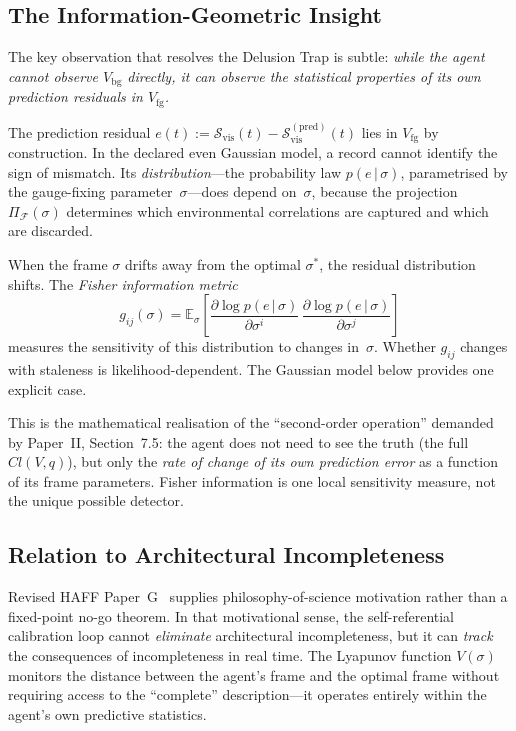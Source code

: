 \documentclass[12pt,a4paper,openany]{book}
\begin{document}
\subsection{The Information-Geometric Insight}
\label{T-III-subsec:insight}

The key observation that resolves the Delusion Trap is
subtle:
\emph{while the agent cannot observe $V_{\mathrm{bg}}$
directly, it can observe the statistical properties of its
own prediction residuals in $V_{\mathrm{fg}}$.}

The prediction residual
$e(t) := \mathcal{S}_{\mathrm{vis}}(t)
- \mathcal{S}_{\mathrm{vis}}^{(\mathrm{pred})}(t)$
lies in $V_{\mathrm{fg}}$ by construction.
In the declared even Gaussian model, a record cannot identify the sign
of mismatch.  Its \emph{distribution}---the probability law
$p(e\,|\,\sigma)$, parametrised by the gauge-fixing
parameter~$\sigma$---does depend on~$\sigma$, because the
projection $\Pi_{\mathcal{F}}(\sigma)$ determines which
environmental correlations are captured and which are
discarded.

When the frame $\sigma$ drifts away from the optimal
$\sigma^*$, the residual distribution shifts.
The \emph{Fisher information metric}
\begin{equation}
\label{T-III-eq:fisher_preview}
g_{ij}(\sigma)
= \mathbb{E}_\sigma\!\left[
  \frac{\partial \log p(e\,|\,\sigma)}
       {\partial \sigma^i}\,
  \frac{\partial \log p(e\,|\,\sigma)}
       {\partial \sigma^j}
\right]
\end{equation}
measures the sensitivity of this distribution to changes
in~$\sigma$.
Whether $g_{ij}$ changes with staleness is likelihood-dependent.  The
Gaussian model below provides one explicit case.

This is the mathematical realisation of the
``second-order operation'' demanded by
Paper~II, Section~7.5: the agent does not need to see the
truth (the full $Cl(V,q)$), but only the \emph{rate of
change of its own prediction error} as a function of its
frame parameters.
Fisher information is one local sensitivity measure, not the unique
possible detector.

\subsection{Relation to Architectural Incompleteness}
\label{T-III-subsec:haff_g}

Revised HAFF Paper~G~\cite{Liu2026HAFF_G} supplies
philosophy-of-science motivation rather than a fixed-point no-go
theorem.  In that motivational sense,
the self-referential calibration loop cannot \emph{eliminate}
architectural incompleteness, but it can \emph{track}
the consequences of incompleteness in real time.
The Lyapunov function $V(\sigma)$ monitors the distance
between the agent's frame and the optimal frame without
requiring access to the ``complete'' description---it
operates entirely within the agent's own predictive
statistics.
\end{document}

